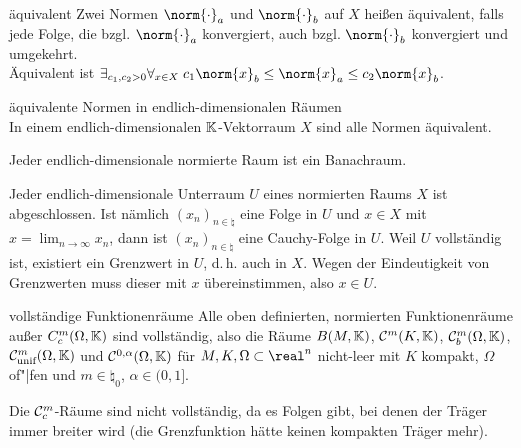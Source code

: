 \linie

\begin{Def}{äquivalent}
    Zwei Normen $\norm{\cdot}_a$ und $\norm{\cdot}_b$ auf $X$ heißen äquivalent, falls
    jede Folge, die bzgl. $\norm{\cdot}_a$ konvergiert, auch bzgl. $\norm{\cdot}_b$ konvergiert
    und umgekehrt.\\
    Äquivalent ist
    $\exists_{c_1, c_2 > 0} \forall_{x \in X}\; c_1 \norm{x}_b \le \norm{x}_a \le c_2 \norm{x}_b$.
\end{Def}

\begin{Satz}{äquivalente Normen in endlich-dimensionalen Räumen}\\
    In einem endlich-dimensionalen $\mathbb{K}$-Vektorraum $X$ sind alle Normen äquivalent.
\end{Satz}

\begin{Kor}
    Jeder endlich-dimensionale normierte Raum ist ein Banachraum.
\end{Kor}

\begin{Bem}
    Jeder endlich-dimensionale Unterraum $U$ eines normierten Raums $X$ ist abgeschlossen.
    Ist nämlich $(x_n)_{n \in \natural}$ eine Folge in $U$ und $x \in X$ mit
    $x = \lim_{n \to \infty} x_n$, dann ist $(x_n)_{n \in \natural}$ eine Cauchy-Folge in $U$.
    Weil $U$ vollständig ist, existiert ein Grenzwert in $U$, d.\,h. auch in $X$.
    Wegen der Eindeutigkeit von Grenzwerten muss dieser mit $x$ übereinstimmen, also $x \in U$.
\end{Bem}

\linie

\begin{Satz}{vollständige Funktionenräume}
    Alle oben definierten, normierten Funktionenräume außer $C^m_c(\Omega, \mathbb{K})$ sind
    vollständig,
    also die Räume
    $B(M, \mathbb{K})$,
    $\mathcal{C}^m(K, \mathbb{K})$,
    $\mathcal{C}^m_b(\Omega, \mathbb{K})$,
    $\mathcal{C}^m_{\text{unif}}(\Omega, \mathbb{K})$ und
    $\mathcal{C}^{0,\alpha}(\Omega, \mathbb{K})$
    für $M, K, \Omega \subset \real^n$ nicht-leer mit $K$ kompakt, $\Omega$ of"|fen und
    $m \in \natural_0$, $\alpha \in (0, 1]$.
\end{Satz}

\begin{Bem}
    Die $\mathcal{C}^m_c$-Räume sind nicht vollständig, da es Folgen gibt, bei denen der Träger immer
    breiter wird (die Grenzfunktion hätte keinen kompakten Träger mehr).
\end{Bem}

